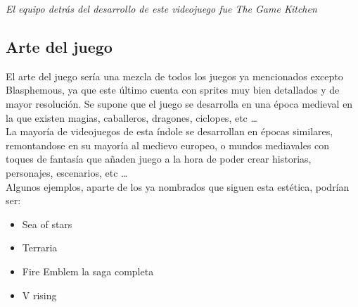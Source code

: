 \documentclass[a4paper]{article}
\begin{document}
\begin{appendices}
    \begin{flushright}
        \textit{El equipo detrás del desarrollo de este videojuego fue The Game Kitchen}
    \end{flushright}
    \subsection{Arte del juego}
    El arte del juego sería una mezcla de todos los juegos ya mencionados excepto Blasphemous, ya que este último cuenta con sprites muy bien detallados y de mayor resolución.
    Se supone que el juego se desarrolla en una época medieval en la que existen magias, caballeros, dragones, ciclopes, etc \dots \\
    La mayoría de videojuegos de esta índole se desarrollan en épocas similares, remontandose en su mayoría al medievo europeo, o mundos mediavales con toques de fantasía que
    añaden juego a la hora de poder crear historias, personajes, escenarios, etc \dots \\
    Algunos ejemplos, aparte de los ya nombrados que siguen esta estética, podrían ser:

    \begin{itemize}
        \item Sea of stars
        \item Terraria
        \item Fire Emblem la saga completa
        \item V rising
    \end{itemize}

    \clearpage


\end{appendices}
\end{document}
